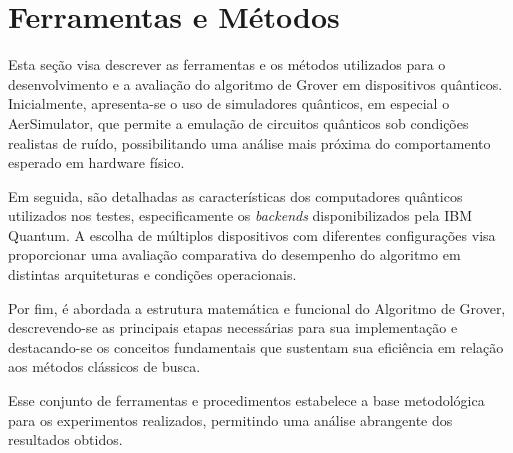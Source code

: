 \chapter{Ferramentas e Métodos}
\label{chap:ferramentas}

Esta seção visa descrever as ferramentas e os métodos utilizados para o desenvolvimento e a avaliação do algoritmo de Grover em dispositivos qu\^{a}nticos. Inicialmente, apresenta-se o uso de simuladores qu\^{a}nticos, em especial o AerSimulator, que permite a emulação de circuitos qu\^{a}nticos sob condições realistas de ruído, possibilitando uma análise mais próxima do comportamento esperado em hardware físico.

Em seguida, são detalhadas as características dos computadores qu\^{a}nticos utilizados nos testes, especificamente os \textit{backends} disponibilizados pela IBM Quantum. A escolha de múltiplos dispositivos com diferentes configurações visa proporcionar uma avaliação comparativa do desempenho do algoritmo em distintas arquiteturas e condições operacionais.

Por fim, é abordada a estrutura matemática e funcional do Algoritmo de Grover, descrevendo-se as principais etapas necessárias para sua implementação e destacando-se os conceitos fundamentais que sustentam sua eficiência em relação aos métodos clássicos de busca.

Esse conjunto de ferramentas e procedimentos estabelece a base metodológica para os experimentos realizados, permitindo uma análise abrangente dos resultados obtidos.
%



